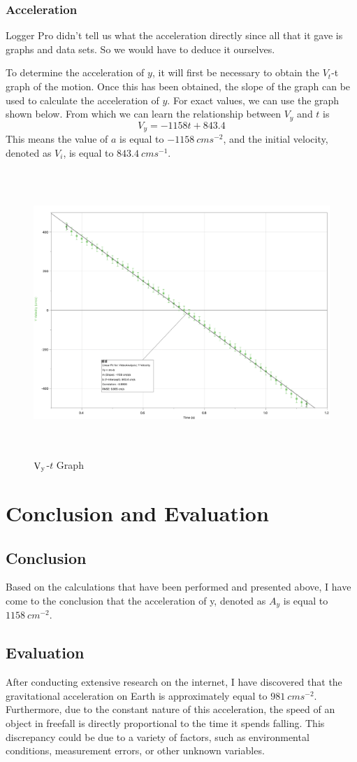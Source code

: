 \documentclass[12pt,a4paper]{article}
\begin{document}
\begin{spacing}{1.25}
\subsubsection{Acceleration}
Logger Pro didn't tell us what the acceleration directly since all that it gave is graphs and data sets. So we would have to deduce it ourselves.\par
To determine the acceleration of $y$, it will first be necessary to obtain the $V_t$-t graph of the motion. Once this has been obtained, the slope of the graph can be used to calculate the acceleration of $y$.
For exact values, we can use the graph shown below. From which we can learn the relationship between $V_y$ and $t$ is
\[
    V_y = -1158 t + 843.4
\]
This means the value of $a$ is equal to $-1158\ cms^{-2}$, and the initial velocity, denoted as $V_i$, is equal to $843.4\ cms^{-1}$.
\begin{figure}[H]
    \centering
    \includegraphics[width=15.9cm, height=10.8cm]{Vy-t.png}
    \caption{\(\rm{V_y}\)-$t$ Graph}
    \label{fig3}
\end{figure}
\section{Conclusion and Evaluation}
\subsection{Conclusion}
Based on the calculations that have been performed and presented above, I have come to the conclusion that the acceleration of y, denoted as \(A_y\) is equal to \(1158\ cm^{-2}\). 
\subsection{Evaluation}
After conducting extensive research on the internet, I have discovered that the gravitational acceleration on Earth is approximately equal to $981\ cms^{-2}$. Furthermore, due to the constant nature of this acceleration, the speed of an object in freefall is directly proportional to the time it spends falling. This discrepancy could be due to a variety of factors, such as environmental conditions, measurement errors, or other unknown variables.
\end{spacing}
\newpage
\end{document}

